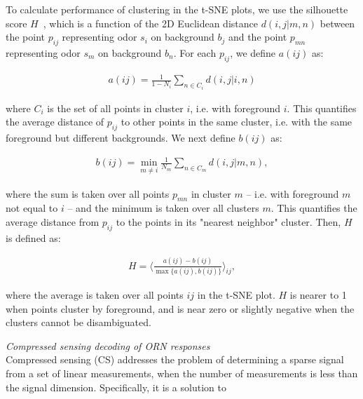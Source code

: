 \documentclass[10pt,prl,aps,showpacs,twocolumn,unsortedaddress,showkeys,linenumbers]{revtex4-1}
\begin{document}
{\color {blue} 

To calculate performance of clustering in the t-SNE plots, we use the silhouette score $H$~\cite{silhouette_score}, which is a function of the 2D Euclidean distance $d(i, j| m, n)$ between the point $p_{ij}$ representing odor $s_i$ on background $b_j$ and the point $p_{mn}$ representing odor $s_m$ on background $b_n$. For each $p_{ij}$, we define $a(ij)$ as:

\begin{align}
    a(ij) = \frac{1}{1-N_i}\sum_{n \in C_i} d(i, j| i, n)
\end{align}

where $C_i$ is the set of all points in cluster $i$, i.e. with foreground $i$. This quantifies the average distance of $p_{ij}$ to other points in the same cluster, i.e. with the same foreground but different backgrounds. We next define $b(ij)$ as:

\begin{align}
    b(ij) = \min_{m \ne i}
    \frac{1}{N_m}\sum_{n \in C_m} d(i, j| m, n),
\end{align}

where the sum is taken over all points $p_{mn}$ in cluster $m$ -- i.e. with foreground $m$ not equal to $i$ -- and the minimum is taken over all clusters $m$. This quantifies the average distance from $p_{ij}$ to the points in its "nearest neighbor" cluster.
Then, $H$ is defined as:

\begin{align}
    H = \langle \frac{a(ij) - b(ij)}{\max\{a(ij), b(ij)\}}
    \rangle_{ij},
\end{align}

where the average is taken over all points $ij$ in the t-SNE plot. $H$ is nearer to 1 when points cluster by foreground, and is near zero or slightly negative when the clusters cannot be disambiguated. \\
}


\textit{Compressed sensing decoding of ORN responses} \\




Compressed sensing (CS) addresses the problem of determining a sparse signal from a set of linear measurements, when the number of measurements is less than the signal dimension. Specifically, it is a solution to 
\end{document}
